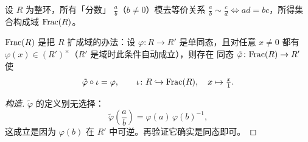 设 $R$ 为整环，所有「分数」 $\frac{a}{b}$（$b\ne 0$）模去等价关系
$\frac{a}{b}\sim\frac{c}{d} \iff ad = bc$，所得集合构成域 $\mathrm{Frac}(R)$。

\begin{theorem}
$\mathrm{Frac}(R)$ 是把 $R$ 扩成域的办法：设
$\varphi\colon R\to R'$ 是单同态，且对任意 $x\ne 0$ 都有
$\varphi(x)\in(R')^\times$（$R'$ 是域时此条件自动成立），则存在
同态 $\tilde\varphi\colon\mathrm{Frac}(R)\to R'$ 使
\[
  \tilde\varphi\circ\iota = \varphi, \qquad
  \iota\colon R\hookrightarrow\mathrm{Frac}(R),\quad x\mapsto\tfrac{x}{1}.
\]
\end{theorem}

\begin{proof}[构造]
$\tilde\varphi$ 的定义别无选择：
\[
  \tilde\varphi\!\left(\frac{a}{b}\right) = \varphi(a)\,\varphi(b)^{-1},
\]
这成立是因为 $\varphi(b)$ 在 $R'$ 中可逆。再验证它确实是同态即可。
\end{proof}
